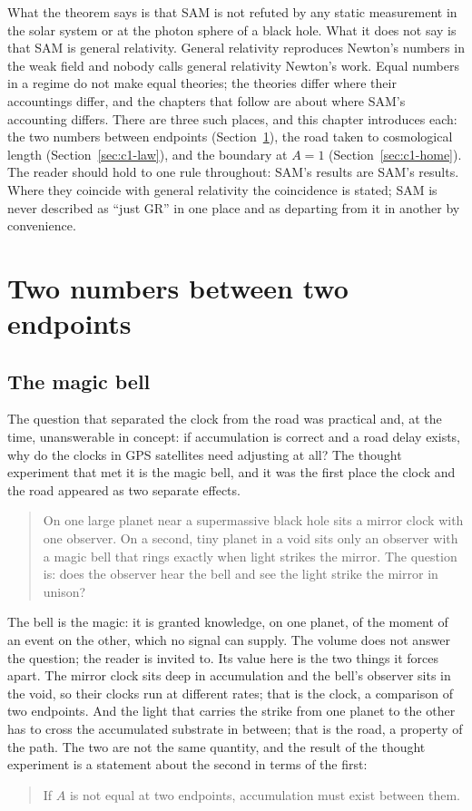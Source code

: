 What the theorem says is that SAM is not refuted by any static measurement in the solar system or at the photon sphere of a black hole. What it does not say is that SAM is general relativity. General relativity reproduces Newton's numbers in the weak field and nobody calls general relativity Newton's work. Equal numbers in a regime do not make equal theories; the theories differ where their accountings differ, and the chapters that follow are about where SAM's accounting differs. There are three such places, and this chapter introduces each: the two numbers between endpoints (Section~\ref{sec:c1-two}), the road taken to cosmological length (Section~\ref{sec:c1-law}), and the boundary at $A=1$ (Section~\ref{sec:c1-home}). The reader should hold to one rule throughout: SAM's results are SAM's results. Where they coincide with general relativity the coincidence is stated; SAM is never described as ``just GR'' in one place and as departing from it in another by convenience.

\section{Two numbers between two endpoints}
\label{sec:c1-two}

\subsection{The magic bell}

The question that separated the clock from the road was practical and, at the time, unanswerable in concept: if accumulation is correct and a road delay exists, why do the clocks in GPS satellites need adjusting at all? The thought experiment that met it is the magic bell, and it was the first place the clock and the road appeared as two separate effects.
\begin{quote}
On one large planet near a supermassive black hole sits a mirror clock with one observer. On a second, tiny planet in a void sits only an observer with a magic bell that rings exactly when light strikes the mirror. The question is: does the observer hear the bell and see the light strike the mirror in unison?
\end{quote}
The bell is the magic: it is granted knowledge, on one planet, of the moment of an event on the other, which no signal can supply. The volume does not answer the question; the reader is invited to. Its value here is the two things it forces apart. The mirror clock sits deep in accumulation and the bell's observer sits in the void, so their clocks run at different rates; that is the clock, a comparison of two endpoints. And the light that carries the strike from one planet to the other has to cross the accumulated substrate in between; that is the road, a property of the path. The two are not the same quantity, and the result of the thought experiment is a statement about the second in terms of the first:
\begin{quote}
If $A$ is not equal at two endpoints, accumulation must exist between them.
\end{quote}

